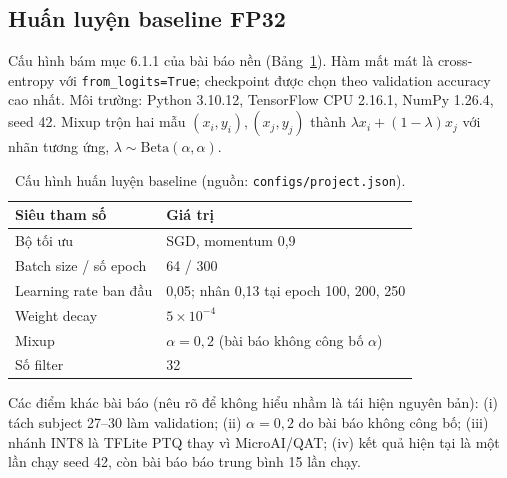 \documentclass[12pt,a4paper]{article}
\newcommand{\code}[1]{\texttt{#1}}
\begin{document}
\subsection{Huấn luyện baseline FP32}
Cấu hình bám mục 6.1.1 của bài báo nền (Bảng~\ref{tab:train}). Hàm mất mát là cross-entropy với \code{from\_logits=True}; checkpoint được chọn theo validation accuracy cao nhất. Môi trường: Python 3.10.12, TensorFlow CPU 2.16.1, NumPy 1.26.4, seed 42. Mixup \cite{zhang2018} trộn hai mẫu $(x_i,y_i),(x_j,y_j)$ thành $\lambda x_i+(1-\lambda)x_j$ với nhãn tương ứng, $\lambda\sim\mathrm{Beta}(\alpha,\alpha)$.

\begin{table}[t]
\centering\small
\begin{tabular}{@{}ll@{}}
\toprule
Siêu tham số & Giá trị \\
\midrule
Bộ tối ưu & SGD, momentum 0,9 \\
Batch size / số epoch & 64 / 300 \\
Learning rate ban đầu & 0,05; nhân 0,13 tại epoch 100, 200, 250 \\
Weight decay & $5\times10^{-4}$ \\
Mixup & $\alpha=0{,}2$ (bài báo không công bố $\alpha$) \\
Số filter & 32 \\
\bottomrule
\end{tabular}
\caption{Cấu hình huấn luyện baseline (nguồn: \code{configs/project.json}).}
\label{tab:train}
\end{table}

Các điểm khác bài báo (nêu rõ để không hiểu nhầm là tái hiện nguyên bản): (i) tách subject 27--30 làm validation; (ii) $\alpha=0{,}2$ do bài báo không công bố; (iii) nhánh INT8 là TFLite PTQ thay vì MicroAI/QAT; (iv) kết quả hiện tại là một lần chạy seed 42, còn bài báo báo trung bình 15 lần chạy.
\end{document}
